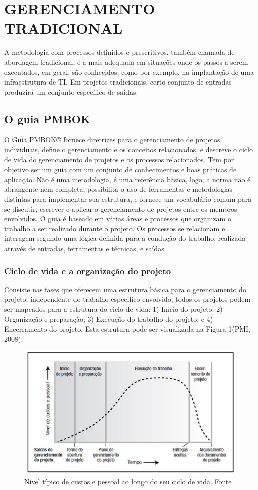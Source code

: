 \section{GERENCIAMENTO TRADICIONAL}
A metodologia com processos definidos e prescritivos, também chamada de abordagem tradicional, é a mais adequada em situações onde os passos a serem executados, em geral, são conhecidos, como por exemplo, na implantação de uma infraestrutura de TI. Em projetos tradicionais, certo conjunto de entradas produzirá um conjunto específico de saídas. \cite{martins2007}

\subsection{O guia PMBOK}
O Guia PMBOK® fornece diretrizes para o gerenciamento de projetos individuais, define o gerenciamento e os conceitos relacionados, e descreve o ciclo de vida do gerenciamento de projetos e os processos relacionados. Tem por objetivo ser um guia com um conjunto de conhecimentos e boas práticas de aplicação. Não é uma metodologia, é uma referência básica, logo, a norma não é abrangente nem completa, possibilita o uso de ferramentas e metodologias distintas para implementar sua estrutura, e fornece um vocabulário comum para se discutir, escrever e aplicar o gerenciamento de projetos entre os membros envolvidos.
O guia é baseado em várias áreas e processos que organizam o trabalho a ser realizado durante o projeto. Os processos se relacionam e interagem segundo uma lógica definida para a condução do trabalho, realizada através de entradas, ferramentas e técnicas, e saídas.

\subsubsection{Ciclo de vida e a organização do projeto}
Consiste nas fases que oferecem uma estrutura básica para o gerenciamento do projeto, independente do trabalho especifico envolvido, todos os projetos podem ser mapeados para a estrutura do ciclo de vida: 1) Início do projeto; 2) Organização e preparação; 3) Execução do trabalho do projeto; e 4) Encerramento do projeto.  Esta estrutura pode ser visualizada na Figura 1(PMI, 2008).

\begin{figure}[!htb]
\centering
\includegraphics{figuras/fig1.eps}
\caption{ Nível típico de custos e pessoal ao longo do seu ciclo de vida. Fonte \cite{pmbok}}
\label{fig1}
\end{figure}



